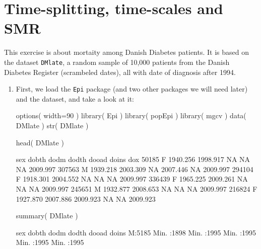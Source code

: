 



\renewcommand{\rwpre}{./graph/DMDK}
\section{Time-splitting, time-scales and SMR}

This exercise is about mortaity among Danish Diabetes patients. It is
based on the dataset \texttt{DMlate}, a random sample of 10,000
patients from the Danish Diabetes Register (scrambeled dates), all
with date of diagnosis after 1994.

\begin{enumerate}


\item First, we load the \texttt{Epi} package (and two other packages
  we will need later) and the dataset, and take a look at it:
\begin{Schunk}
\begin{Sinput}
 options( width=90 )
 library( Epi )
 library( popEpi )
 library( mgcv )
 data( DMlate )
 str( DMlate )
\end{Sinput}
\begin{Sinput}
 head( DMlate )
\end{Sinput}
\begin{Soutput}
       sex    dobth     dodm    dodth    dooad doins      dox
50185    F 1940.256 1998.917       NA       NA    NA 2009.997
307563   M 1939.218 2003.309       NA 2007.446    NA 2009.997
294104   F 1918.301 2004.552       NA       NA    NA 2009.997
336439   F 1965.225 2009.261       NA       NA    NA 2009.997
245651   M 1932.877 2008.653       NA       NA    NA 2009.997
216824   F 1927.870 2007.886 2009.923       NA    NA 2009.923
\end{Soutput}
\begin{Sinput}
 summary( DMlate )
\end{Sinput}
\begin{Soutput}
 sex          dobth           dodm          dodth          dooad          doins     
 M:5185   Min.   :1898   Min.   :1995   Min.   :1995   Min.   :1995   Min.   :1995  

\end{Soutput}
\end{Schunk}
\end{enumerate}
